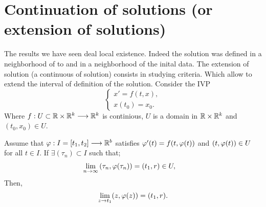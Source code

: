 \section{Continuation of solutions (or extension of solutions)}
The results we have seen deal local existence. Indeed the solution was defined in a neighborhood
of to and in a neighborhood of the inital data. The extension of solution (a continuous of solution)
consists in studying criteria. Which allow to extend the interval of definition of the solution. Consider
the IVP
\[
\begin{cases}
x' = f(t, x), \\
x(t_0) = x_0.
\end{cases}
\]
Where $f : U \subset \mathbb{R}  \times \mathbb{R} ^{k}  \longrightarrow \mathbb{R}^k$ is 
continious, $U$ is a domain in $\mathbb{R}  \times \mathbb{R} ^{k} $ and $(t_0, x_0) \in  U$.
\begin{corollary}[]
  Assume that $ \varphi : I = [t_1, t_2] \longrightarrow \mathbb{R} ^{b} $ satisfies $\varphi'(t)  =  f(t, \varphi(t) )$ 
  and $(t, \varphi(t) ) \in  U $ for all $t \in   I $. If $\exists (\tau _n ) \subset I $ such that; 
  \begin{align*}
    \lim_{n \to \infty} \left( \tau _n , \varphi(\tau _n )  \right) &=   
    (t_1, r) \in  U,
  \end{align*}
  Then, 
  \[
  \lim_{z \to t_1} (z, \varphi(z) )  = 
  (t_1, r) .
  \]
\end{corollary}
